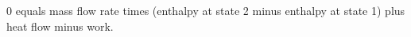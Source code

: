 0 equals mass flow rate times (enthalpy at state 2 minus enthalpy at state 1) plus heat flow minus work.